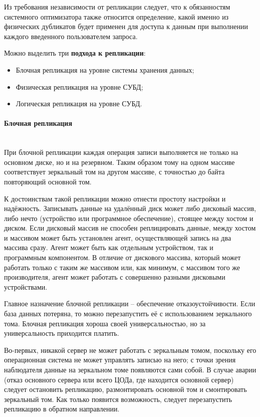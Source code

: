 Из требования независимости от репликации следует, что к обязанностям системного оптимизатора также относится
определение, какой именно из физических дубликатов будет применен для доступа к данным при выполнении каждого
введенного пользователем запроса. \autocite{IntroBD2014}

Можно выделить три \textbf{подхода к репликации}:
\begin{itemize}
    \item Блочная репликация на уровне системы хранения данных;
    \item Физическая репликация на уровне СУБД;
    \item Логическая репликация на уровне СУБД.
\end{itemize}

\paragraph{Блочная репликация} ~\\
При блочной репликации каждая операция записи выполняется не только на основном диске, но и на резервном. Таким образом
тому на одном массиве соответствует зеркальный том на другом массиве, с точностью до байта повторяющий основной том.

К достоинствам такой репликации можно отнести простоту настройки и надёжность. Записывать данные на удалённый диск может
либо дисковый массив, либо нечто (устройство или программное обеспечение), стоящее между хостом и диском. Если дисковый
массив не способен реплицировать данные, между хостом и массивом может быть установлен агент, осуществляющей запись на
два массива сразу. Агент может быть как отдельным устройством, так и программным компонентом. В отличие от дискового
массива, который может работать только с таким же массивом или, как минимум, с массивом того же производителя, агент
может работать с совершенно разными дисковыми устройствами.

Главное назначение блочной репликации – обеспечение отказоустойчивости. Если база данных потеряна, то можно
перезапустить её с использованием зеркального тома. Блочная репликация хороша своей универсальностью, но за
универсальность приходится платить.

Во-первых, никакой сервер не может работать с зеркальным томом, поскольку его операционная система не может управлять
записью на него; с точки зрения наблюдателя данные на зеркальном томе появляются сами собой. В случае аварии (отказ
основного сервера или всего ЦОДа, где находится основной сервер) следует остановить репликацию, размонтировать основной
том и смонтировать зеркальный том. Как только появится возможность, следует перезапустить репликацию в обратном
направлении.

